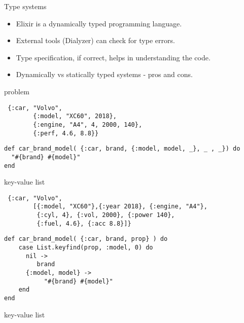 \begin{frame}{Type systems}

\begin{itemize}
\item Elixir is a dynamically typed programming language. \pause
\item External tools (Dialyzer) can check for type errors.  \pause
\item Type specification, if correct, helps in understanding the code.  \pause
\item Dynamically vs statically typed systems - pros and cons.  \pause
\end{itemize}

\end{frame}

\begin{frame}[fragile]{problem}

\begin{verbatim}
 {:car, "Volvo", 
        {:model, "XC60", 2018}, 
        {:engine, "A4", 4, 2000, 140}, 
        {:perf, 4.6, 8.8}}
\end{verbatim}

\vspace{20pt} \pause
  
\begin{verbatim}
def car_brand_model( {:car, brand, {:model, model, _}, _ , _}) do 
  "#{brand} #{model}"
end
\end{verbatim}
\end{frame}


\begin{frame}[fragile]{key-value list}

\begin{verbatim}
 {:car, "Volvo", 
        [{:model, "XC60"},{:year 2018}, {:engine, "A4"}, 
         {:cyl, 4}, {:vol, 2000}, {:power 140}, 
         {:fuel, 4.6}, {:acc 8.8}]}
\end{verbatim}
  
\vspace{20pt} \pause

\begin{verbatim}
def car_brand_model( {:car, brand, prop} ) do
    case List.keyfind(prop, :model, 0) do
      nil -> 
         brand
      {:model, model} ->
           "#{brand} #{model}"
    end
end
\end{verbatim}
\end{frame}

\begin{frame}[fragile]{key-value list}

\vspace{20pt}


\vspace{40pt}
  
\end{frame}


